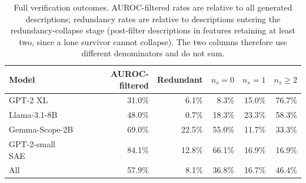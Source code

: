 \begin{table}[h]
\centering
\caption{
Full verification outcomes. AUROC-filtered rates are relative to all generated
descriptions; redundancy rates are relative to descriptions entering the
redundancy-collapse stage (post-filter descriptions in features retaining at
least two, since a lone survivor cannot collapse). The two columns therefore
use different denominators and do not sum.
}
\label{tab:verification-outcomes-full}
\begin{tabular}{lrrrrr}
\toprule
Model & AUROC-filtered & Redundant & \(n_s=0\) & \(n_s=1\) & \(n_s\geq2\) \\
\midrule
GPT-2 XL       & 31.0\% & 6.1\% & 8.3\% & 15.0\% & 76.7\% \\
Llama-3.1-8B   & 48.0\% & 0.7\% & 18.3\% & 23.3\% & 58.3\% \\
Gemma-Scope-2B & 69.0\% & 22.5\% & 55.0\% & 11.7\% & 33.3\% \\
GPT-2-small SAE & 84.1\% & 12.8\% & 66.1\% & 16.9\% & 16.9\% \\
\midrule
All            & 57.9\% & 8.1\% & 36.8\% & 16.7\% & 46.4\% \\
\bottomrule
\end{tabular}
\end{table}
